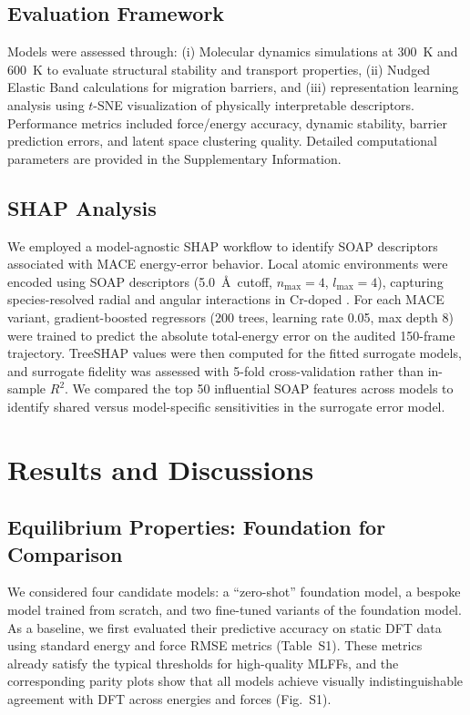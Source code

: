 \documentclass[pdflatex,sn-mathphys-num]{sn-jnl}%
\providecommand{\reviewermap}[3]{}
\theoremstyle{thmstyleone}%
\theoremstyle{thmstyletwo}%
\theoremstyle{thmstylethree}%
\begin{document}
\subsection{Evaluation Framework}
Models were assessed through: (i) Molecular dynamics simulations at 300~K and 600~K to evaluate structural stability and transport properties, (ii) Nudged Elastic Band calculations for migration barriers, and (iii) representation learning analysis using $t$-SNE visualization of physically interpretable descriptors. Performance metrics included force/energy accuracy, dynamic stability, barrier prediction errors, and latent space clustering quality. Detailed computational parameters are provided in the Supplementary Information.

\subsection{SHAP Analysis}
\reviewermap{REV-A6/REV-C13}{done-local}{SHAP methods updated to the audited 150-frame absolute-energy-error surrogate workflow.}
We employed a model-agnostic SHAP workflow to identify SOAP descriptors associated with MACE energy-error behavior. Local atomic environments were encoded using SOAP descriptors (5.0~\AA\ cutoff, $n_{\mathrm{max}}=4$, $l_{\mathrm{max}}=4$), capturing species-resolved radial and angular interactions in Cr-doped . For each MACE variant, gradient-boosted regressors (200 trees, learning rate 0.05, max depth 8) were trained to predict the absolute total-energy error on the audited 150-frame trajectory. TreeSHAP values were then computed for the fitted surrogate models, and surrogate fidelity was assessed with 5-fold cross-validation rather than in-sample $R^2$. We compared the top 50 influential SOAP features across models to identify shared versus model-specific sensitivities in the surrogate error model.


\section{Results and Discussions}

\subsection{Equilibrium Properties: Foundation for Comparison}
We considered four candidate models: a ``zero-shot'' foundation model, a bespoke model trained from scratch, and two fine-tuned variants of the foundation model. As a baseline, we first evaluated their predictive accuracy on static DFT data using standard energy and force RMSE metrics (Table~S1). These metrics already satisfy the typical thresholds for high-quality MLFFs, and the corresponding parity plots show that all models achieve visually indistinguishable agreement with DFT across energies and forces (Fig.~S1). 
\end{document}

